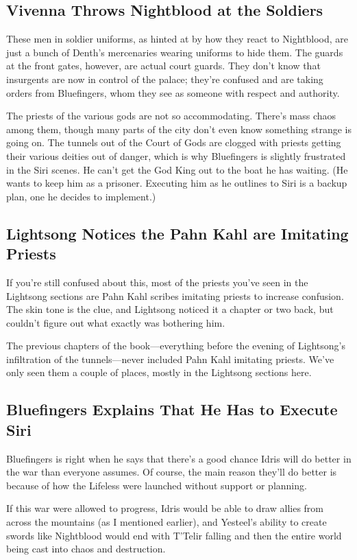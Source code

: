 \subsection*{Vivenna Throws Nightblood at the Soldiers}

These men in soldier uniforms, as hinted at by how they react to Nightblood, are just a bunch of Denth’s mercenaries wearing uniforms to hide them. The guards at the front gates, however, are actual court guards. They don’t know that insurgents are now in control of the palace; they’re confused and are taking orders from Bluefingers, whom they see as someone with respect and authority.

The priests of the various gods are not so accommodating. There’s mass chaos among them, though many parts of the city don’t even know something strange is going on. The tunnels out of the Court of Gods are clogged with priests getting their various deities out of danger, which is why Bluefingers is slightly frustrated in the Siri scenes. He can’t get the God King out to the boat he has waiting. (He wants to keep him as a prisoner. Executing him as he outlines to Siri is a backup plan, one he decides to implement.)

\subsection*{Lightsong Notices the Pahn Kahl are Imitating Priests}

If you’re still confused about this, most of the priests you’ve seen in the Lightsong sections are Pahn Kahl scribes imitating priests to increase confusion. The skin tone is the clue, and Lightsong noticed it a chapter or two back, but couldn’t figure out what exactly was bothering him.

The previous chapters of the book—everything before the evening of Lightsong’s infiltration of the tunnels—never included Pahn Kahl imitating priests. We’ve only seen them a couple of places, mostly in the Lightsong sections here.

\subsection*{Bluefingers Explains That He Has to Execute Siri}

Bluefingers is right when he says that there’s a good chance Idris will do better in the war than everyone assumes. Of course, the main reason they’ll do better is because of how the Lifeless were launched without support or planning.

If this war were allowed to progress, Idris would be able to draw allies from across the mountains (as I mentioned earlier), and Yesteel’s ability to create swords like Nightblood would end with T’Telir falling and then the entire world being cast into chaos and destruction.



